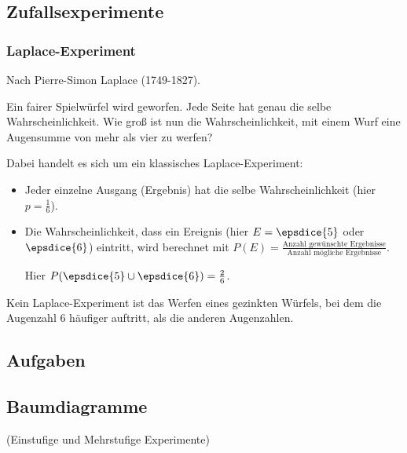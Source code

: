 
\subsection{Zufallsexperimente}

\subsubsection{Laplace-Experiment}
Nach Pierre-Simon Laplace (1749-1827).

Ein fairer Spielwürfel wird geworfen. Jede Seite hat genau die selbe
Wahrscheinlichkeit. Wie groß ist nun die Wahrscheinlichkeit, mit einem
Wurf eine Augensumme von mehr als vier zu werfen?


Dabei handelt es sich um ein klassisches Laplace-Experiment:
\begin{itemize}
\item Jeder einzelne Ausgang (Ergebnis) hat die selbe Wahrscheinlichkeit
      (hier $p = \frac{1}{6}$).
\item Die Wahrscheinlichkeit, dass ein Ereignis (hier $E = \epsdice{5}$
oder $\epsdice{6}$) eintritt, wird berechnet mit $P(E)
= \frac{\textrm{Anzahl gewünschte Ergebnisse}}{\textrm{Anzahl
mögliche Ergebnisse}}$.

Hier $P(\epsdice{5}\cup\epsdice{6}) = \frac{2}{6}$.
\end{itemize}

Kein Laplace-Experiment ist \zB das Werfen eines gezinkten Würfels,
bei dem die Augenzahl 6 häufiger auftritt, als die anderen Augenzahlen.

\subsection*{Aufgaben}

\newpage


\subsection{Baumdiagramme}
(Einstufige und Mehrstufige Experimente)

